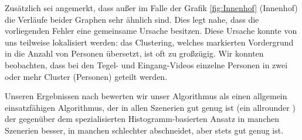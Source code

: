Zusätzlich sei angemerkt, dass außer im Falle der Grafik \ref{fig:Innenhof} (Innenhof) die Verläufe beider Graphen sehr ähnlich sind. Dies legt nahe, dass die vorliegenden Fehler eine gemeinsame Ursache besitzen. Diese Ursache konnte von uns teilweise lokalisiert werden: das Clustering, welches markierten Vordergrund in die Anzahl von Personen übersetzt, ist oft zu großzügig. Wir konnten beobachten, dass bei den Tegel- und Eingang-Videos einzelne Personen in zwei oder mehr Cluster (Personen) geteilt werden.

Unseren Ergebnissen nach bewerten wir unser Algorithmus als einen allgemein einsatzfähigen Algorithmus, der in allen Szenerien gut genug ist (ein \glqq allrounder \grqq{}) der gegenüber dem spezialisierten Histogramm-basierten Ansatz in manchen Szenerien besser, in manchen schlechter abschneidet, aber stets gut genug ist.